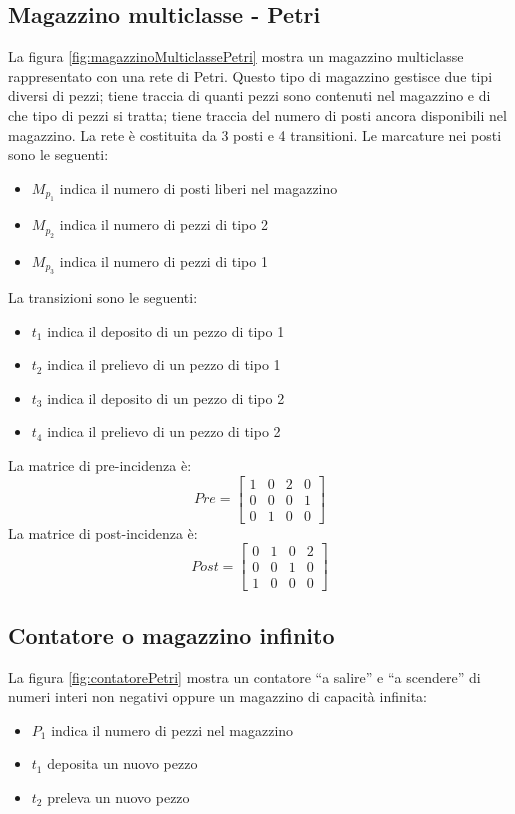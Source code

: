 \documentclass[a4paper]{report}
\begin{document}
\subsection{Magazzino multiclasse - Petri}

La figura \ref{fig:magazzinoMulticlassePetri} mostra un magazzino
multiclasse rappresentato con una rete di Petri. Questo tipo di
magazzino gestisce due tipi diversi di pezzi; tiene traccia di quanti
pezzi sono contenuti nel magazzino e di che tipo di pezzi si tratta;
tiene traccia del numero di posti ancora disponibili nel magazzino. La
rete \`e costituita da 3 posti e 4 transitioni. Le marcature nei posti
sono le seguenti: 
\begin{itemize}
\item $M_{p_1}$ indica il numero di posti liberi nel magazzino
\item $M_{p_2}$ indica il numero di pezzi di tipo 2
\item $M_{p_3}$ indica il numero di pezzi di tipo 1
\end{itemize}
La transizioni sono le seguenti:
\begin{itemize}
\item $t_1$ indica il deposito di un pezzo di tipo 1
\item $t_2$ indica il prelievo di un pezzo di tipo 1
\item $t_3$ indica il deposito di un pezzo di tipo 2
\item $t_4$ indica il prelievo di un pezzo di tipo 2
\end{itemize}
La matrice di pre-incidenza \`e:
\[
Pre = 
\begin{bmatrix}
  1 & 0 & 2 & 0\\
  0 & 0 & 0 & 1\\
  0 & 1 & 0 & 0
\end{bmatrix}
\]
La matrice di post-incidenza \`e:
\[
Post =
\begin{bmatrix}
  0 & 1 & 0 & 2\\
  0 & 0 & 1 & 0\\
  1 & 0 & 0 & 0
\end{bmatrix}
\]

\subsection{Contatore o magazzino infinito}
La figura \ref{fig:contatorePetri} mostra un contatore ``a salire'' e
``a scendere'' di numeri interi non negativi oppure un magazzino di
capacit\`a infinita:
\begin{itemize}
\item $P_1$ indica il numero di pezzi nel magazzino
\item $t_1$ deposita un nuovo pezzo
\item $t_2$ preleva un nuovo pezzo
\end{itemize}

\end{document}
